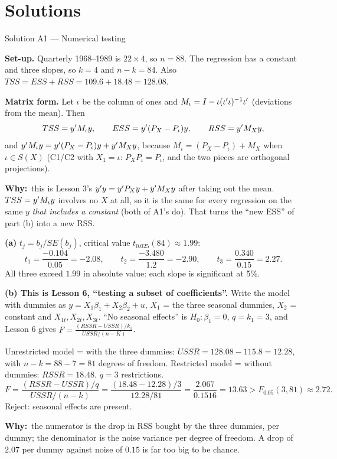 \documentclass[11pt]{article}
\newcommand{\step}[1]{\par\smallskip\noindent\textbf{\textcolor{qnavy}{#1}}\quad\ignorespaces}
\newcommand{\Why}{\textbf{\textcolor{whyline}{Why:}}\ }
\begin{document}
\clearpage
\section{Solutions}\label{sec:solutions}

\begin{solbox}{Solution A1 --- Numerical testing}
\step{Set-up.} Quarterly 1968--1989 is $22 \times 4$, so $n = 88$. The regression has a
constant and three slopes, so $k = 4$ and $n - k = 84$. Also
$TSS = ESS + RSS = 109.6 + 18.48 = 128.08$.
\step{Matrix form.} Let $\iota$ be the column of ones and
$M_{\iota} = I - \iota(\iota^{\prime}\iota)^{-1}\iota^{\prime}$ (deviations from the mean). Then
\[
  TSS = y^{\prime} M_{\iota}y, \qquad ESS = y^{\prime}(P_{X} - P_{\iota})y, \qquad RSS = y^{\prime} M_{X}y,
\]
and $y^{\prime} M_{\iota}y = y^{\prime}(P_{X} - P_{\iota})y + y^{\prime} M_{X}y$, because
$M_{\iota} = (P_{X} - P_{\iota}) + M_{X}$ when $\iota \in S(X)$ (C1/C2 with $X_{1} = \iota$:
$P_{X}P_{\iota} = P_{\iota}$, and the two pieces are orthogonal projections).
\begin{why}\Why this is Lesson 3's $y^{\prime} y = y^{\prime} P_{X}y + y^{\prime} M_{X}y$ after taking out the
mean. $TSS = y^{\prime} M_{\iota}y$ involves no $X$ at all, so it is the same for every regression
on the same $y$ \emph{that includes a constant} (both of A1's do). That turns the ``new ESS''
of part (b) into a new RSS.\end{why}

\step{(a)} $t_{j} = b_{j}/SE(b_{j})$, critical value $t_{0.025}(84) \approx 1.99$:
\[
  t_{1} = \frac{-0.104}{0.05} = -2.08, \qquad
  t_{2} = \frac{-3.480}{1.2} = -2.90, \qquad
  t_{3} = \frac{0.340}{0.15} = 2.27 .
\]
All three exceed $1.99$ in absolute value: each slope is significant at 5\%.

\step{(b) This is Lesson 6, ``testing a subset of coefficients''.} Write the model with
dummies as $y = X_{1}\beta_{1} + X_{2}\beta_{2} + u$, $X_{1}$ = the three seasonal dummies,
$X_{2}$ = constant and $X_{1t}, X_{2t}, X_{3t}$. ``No seasonal effects'' is $H_{0}: \beta_{1} = 0$,
$q = k_{1} = 3$, and Lesson 6 gives $F = \frac{(RSSR - USSR)/k_{1}}{USSR/(n-K)}$.
\par\noindent Unrestricted model = with the three dummies:
$USSR = 128.08 - 115.8 = 12.28$, with $n - k = 88 - 7 = 81$ degrees of freedom.
Restricted model = without dummies: $RSSR = 18.48$. $q = 3$ restrictions.
\[
  F = \frac{(RSSR - USSR)/q}{USSR/(n-k)} = \frac{(18.48 - 12.28)/3}{12.28/81}
    = \frac{2.067}{0.1516} = 13.63 > F_{0.05}(3,81) \approx 2.72 .
\]
Reject: seasonal effects are present.
\begin{why}\Why the numerator is the drop in RSS bought by the three dummies, per
dummy; the denominator is the noise variance per degree of freedom. A drop of $2.07$
per dummy against noise of $0.15$ is far too big to be chance.\end{why}


\end{solbox}
\end{document}
